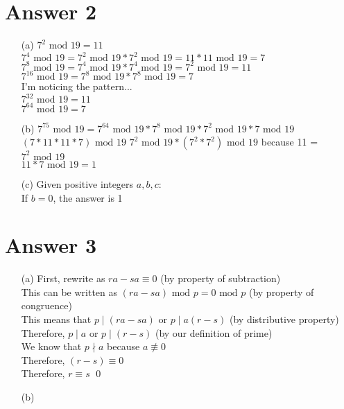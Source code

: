 \documentclass[11pt]{article}
\theoremstyle{definition}
\begin{document}
\section*{Answer 2}
\begin{enumerate}
	\item[(a)]
	$7^2 \text{ mod } 19 = 11$\\
	$7^4 \text{ mod } 19 = 7^2 \text{ mod } 19 * 7^2 \text{ mod } 19 = 11 * 11 \text{ mod } 19 = 7$\\
	$7^8 \text{ mod } 19 = 7^4 \text{ mod } 19 * 7^4 \text{ mod } 19 = 7^2 \text{ mod } 19 = 11$\\
	$7^{16} \text{ mod } 19 = 7^8 \text{ mod } 19 * 7^8 \text{ mod } 19 = 7$\\
	I'm noticing the pattern...\\
	$7^{32} \text{ mod } 19 = 11$\\
	$7^{64} \text{ mod } 19 = 7$

	\item[(b)]
	$7^{75} \text{ mod } 19 = 7^{64} \text{ mod } 19 * 7^8 \text{ mod } 19 * 7^2 \text{ mod } 19 * 7 \text{ mod } 19$\\
	$(7 * 11 * 11 * 7) \text{ mod } 19$
	$7^2 \text{ mod } 19 * (7^2 * 7^2) \text{ mod } 19$ because 11 = $7^2 \text{ mod } 19$\\
	$11 * 7 \text{ mod } 19 = 1$\\

	\item[(c)]
	Given positive integers $a, b, c$:\\
	If $b = 0$, the answer is 1\\

\end{enumerate}

\section*{Answer 3}
\begin{enumerate}
	\item[(a)]
	First, rewrite as $ra - sa \equiv 0$ (by property of subtraction)\\
	This can be written as $(ra - sa) \text{ mod } p = 0 \text{ mod } p$ (by property of congruence)\\
	This means that $p \mid (ra - sa)$ or $p \mid a(r - s)$ (by distributive property)\\
	Therefore, $p \mid a$ or $p \mid (r - s)$ (by our definition of prime)\\
	We know that $p \nmid a$ because $a \nequiv 0$\\
	Therefore, $(r - s) \equiv 0$\\
	Therefore, $r \equiv s$ \qed

	\item[(b)]
	

\end{enumerate}
\end{document}
